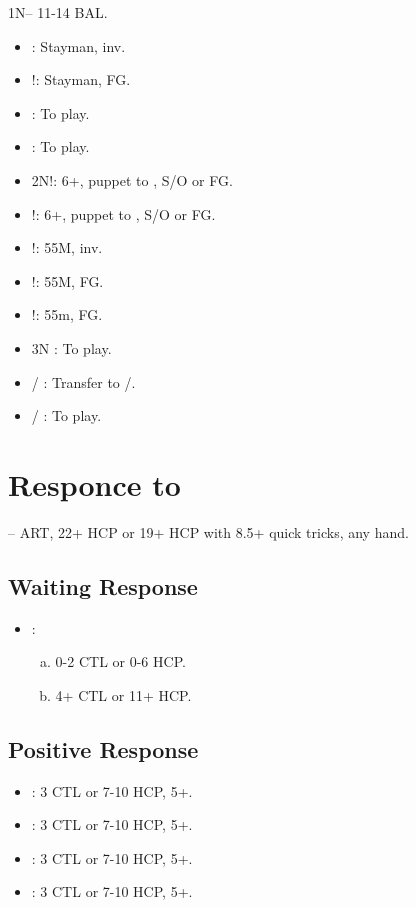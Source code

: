 \documentclass[12pt,twoside,a5paper]{report}%
\begin{document}
	1N-- 11-14 BAL.
	\begin{itemize}
	\renewcommand{\labelitemi}{}
	\item {} : Stayman, inv.
	\item {}!: Stayman, FG.
	\item {} : To play.
	\item {} : To play.
	\item 2N!: 6+\cl{}, puppet to , S/O or FG.
	\item {}!: 6+\di{}, puppet to , S/O or FG.
	\item {}!: 55M, inv.
	\item {}!: 55M, FG.
	\item {}!: 55m, FG.
	\item 3N : To play.
	\item {}/ : Transfer to /\sp{}.
	\item {}/ : To play.
	\end{itemize}

\chapter*{Responce to }
	-- ART, 22+ HCP or 19+ HCP with 8.5+ quick tricks, any hand.
	\section*{Waiting Response}
	\begin{itemize}
	\renewcommand{\labelitemi}{}
	\item {} : 
		\begin{enumerate}[(a)]
		\item 0-2 CTL or 0-6 HCP.
		\item 4+ CTL or 11+ HCP.
		\end{enumerate}
	\end{itemize}
	\section*{Positive Response}
	\begin{itemize}
	\renewcommand{\labelitemi}{}
	\item {}: 3 CTL or 7-10 HCP, 5+\he{}.
	\item {}: 3 CTL or 7-10 HCP, 5+\sp{}.
	\item {}: 3 CTL or 7-10 HCP, 5+\cl{}.
	\item {}: 3 CTL or 7-10 HCP, 5+\di{}.
	\end{itemize}
\end{document}
